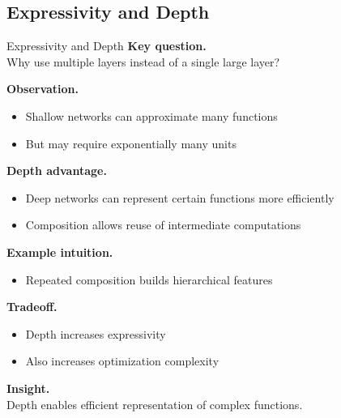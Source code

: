 \documentclass[aspectratio=169,11pt]{beamer}
\begin{document}
\subsection{Expressivity and Depth}
\begin{frame}[t,allowframebreaks]{Expressivity and Depth}
\small
\textbf{Key question.}\\ Why use multiple layers instead of a single large layer?

\textbf{Observation.}\\ \begin{itemize}
    \item Shallow networks can approximate many functions
    \item But may require exponentially many units
\end{itemize}

\textbf{Depth advantage.}\\ \begin{itemize}
    \item Deep networks can represent certain functions more efficiently
    \item Composition allows reuse of intermediate computations
\end{itemize}

\textbf{Example intuition.}\\ \begin{itemize}
    \item Repeated composition builds hierarchical features
\end{itemize}

\textbf{Tradeoff.}\\ \begin{itemize}
    \item Depth increases expressivity
    \item Also increases optimization complexity
\end{itemize}

\textbf{Insight.}\\ Depth enables efficient representation of complex functions.
\end{frame}
\end{document}
